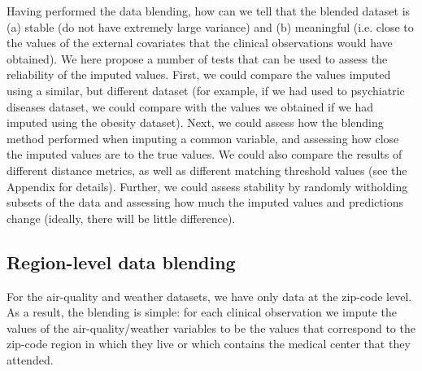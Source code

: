 \documentclass{article}
\begin{document}
Having performed the data blending, how can we tell that the blended dataset is (a) stable (do not have extremely large variance) and (b) meaningful (i.e. close to the values of the external covariates that the clinical observations would have obtained). We here propose a number of tests that can be used to assess the reliability of the imputed values. First, we could compare the values imputed using a similar, but different dataset (for example, if we had used to psychiatric diseases dataset, we could compare with the values we obtained if we had imputed using the obesity dataset). Next, we could assess how the blending method performed when imputing a common variable, and assessing how close the imputed values are to the true values. We could also compare the results of different distance metrics, as well as different matching threshold values (see the Appendix for details). Further, we could assess stability by randomly witholding subsets of the data and assessing how much the imputed values and predictions change (ideally, there will be little difference).


\subsection{Region-level data blending}


For the air-quality and weather datasets, we have only data at the zip-code level. As a result, the blending is simple: for each clinical observation we impute the values of the air-quality/weather variables to be the values that correspond to the zip-code region in which they live or which contains the medical center that they attended.
\end{document}
